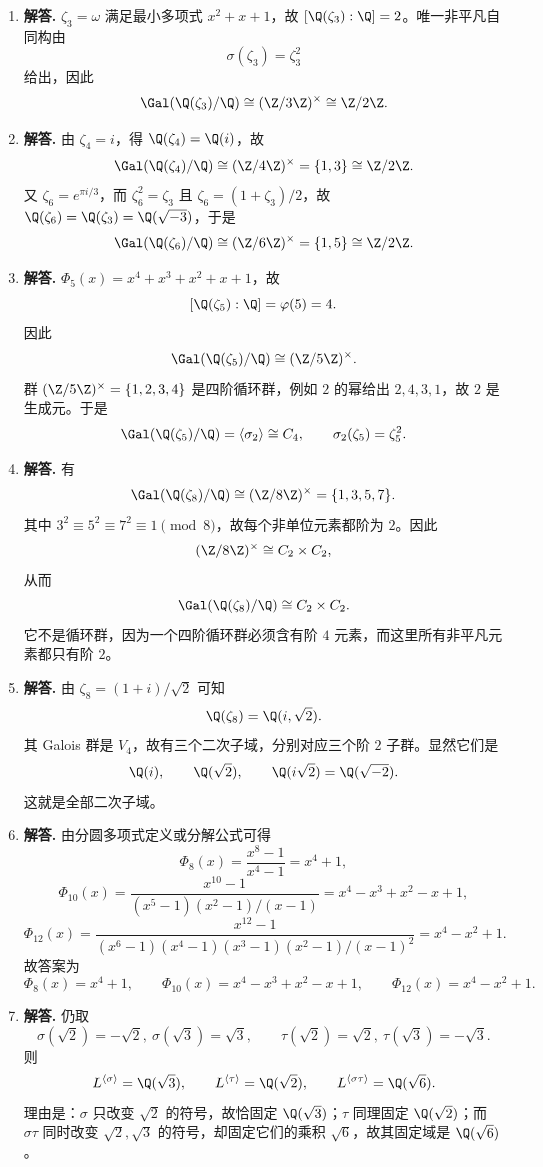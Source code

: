 \begin{enumerate}[label=\textbf{\arabic*.}, leftmargin=*, itemsep=1em]
\item \textbf{解答.} $\zeta_3=\omega$ 满足最小多项式 $x^2+x+1$，故 $[\Q(\zeta_3):\Q]=2$。唯一非平凡自同构由
\[
\sigma(\zeta_3)=\zeta_3^2
\]
给出，因此
\[
\Gal(\Q(\zeta_3)/\Q)\cong (\Z/3\Z)^\times\cong \Z/2\Z.
\]

\item \textbf{解答.} 由 $\zeta_4=i$，得 $\Q(\zeta_4)=\Q(i)$，故
\[
\Gal(\Q(\zeta_4)/\Q)\cong (\Z/4\Z)^\times=\{1,3\}\cong \Z/2\Z.
\]
又 $\zeta_6=e^{\pi i/3}$，而 $\zeta_6^2=\zeta_3$ 且 $\zeta_6=(1+\zeta_3)/2$，故 $\Q(\zeta_6)=\Q(\zeta_3)=\Q(\sqrt{-3})$，于是
\[
\Gal(\Q(\zeta_6)/\Q)\cong (\Z/6\Z)^\times=\{1,5\}\cong \Z/2\Z.
\]

\item \textbf{解答.} $\Phi_5(x)=x^4+x^3+x^2+x+1$，故
\[
[\Q(\zeta_5):\Q]=\varphi(5)=4.
\]
因此
\[
\Gal(\Q(\zeta_5)/\Q)\cong (\Z/5\Z)^\times.
\]
群 $(\Z/5\Z)^\times=\{1,2,3,4\}$ 是四阶循环群，例如 $2$ 的幂给出 $2,4,3,1$，故 $2$ 是生成元。于是
\[
\Gal(\Q(\zeta_5)/\Q)=\langle \sigma_2\rangle\cong C_4,
\qquad \sigma_2(\zeta_5)=\zeta_5^2.
\]

\item \textbf{解答.} 有
\[
\Gal(\Q(\zeta_8)/\Q)\cong (\Z/8\Z)^\times=\{1,3,5,7\}.
\]
其中 $3^2\equiv5^2\equiv7^2\equiv1\pmod8$，故每个非单位元素都阶为 $2$。因此
\[
(\Z/8\Z)^\times\cong C_2\times C_2,
\]
从而
\[
\Gal(\Q(\zeta_8)/\Q)\cong C_2\times C_2.
\]
它不是循环群，因为一个四阶循环群必须含有阶 $4$ 元素，而这里所有非平凡元素都只有阶 $2$。

\item \textbf{解答.} 由 $\zeta_8=(1+i)/\sqrt2$ 可知
\[
\Q(\zeta_8)=\Q(i,\sqrt2).
\]
其 Galois 群是 $V_4$，故有三个二次子域，分别对应三个阶 $2$ 子群。显然它们是
\[
\Q(i),\qquad \Q(\sqrt2),\qquad \Q(i\sqrt2)=\Q(\sqrt{-2}).
\]
这就是全部二次子域。

\item \textbf{解答.} 由分圆多项式定义或分解公式可得
\[
\Phi_8(x)=\frac{x^8-1}{x^4-1}=x^4+1,
\]
\[
\Phi_{10}(x)=\frac{x^{10}-1}{(x^5-1)(x^2-1)/(x-1)}=x^4-x^3+x^2-x+1,
\]
\[
\Phi_{12}(x)=\frac{x^{12}-1}{(x^6-1)(x^4-1)(x^3-1)(x^2-1)/(x-1)^2}=x^4-x^2+1.
\]
故答案为
\[
\Phi_8(x)=x^4+1,\qquad \Phi_{10}(x)=x^4-x^3+x^2-x+1,\qquad \Phi_{12}(x)=x^4-x^2+1.
\]

\item \textbf{解答.} 仍取
\[
\sigma(\sqrt2)=-\sqrt2,\ \sigma(\sqrt3)=\sqrt3,
\qquad
\tau(\sqrt2)=\sqrt2,\ \tau(\sqrt3)=-\sqrt3.
\]
则
\[
L^{\langle\sigma\rangle}=\Q(\sqrt3),
\qquad
L^{\langle\tau\rangle}=\Q(\sqrt2),
\qquad
L^{\langle\sigma\tau\rangle}=\Q(\sqrt6).
\]
理由是：$\sigma$ 只改变 $\sqrt2$ 的符号，故恰固定 $\Q(\sqrt3)$；$\tau$ 同理固定 $\Q(\sqrt2)$；而 $\sigma\tau$ 同时改变 $\sqrt2,\sqrt3$ 的符号，却固定它们的乘积 $\sqrt6$，故其固定域是 $\Q(\sqrt6)$。


\end{enumerate}
